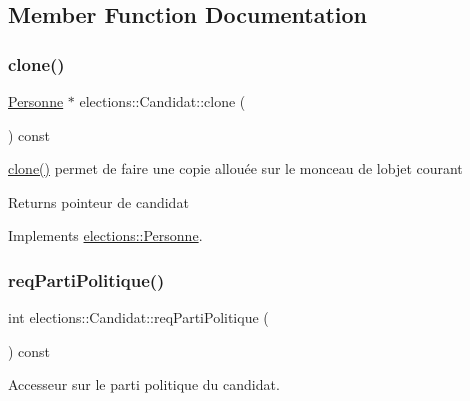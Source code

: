 \subsection{Member Function Documentation}
\mbox{\label{classelections_1_1Candidat_ac93fed3409eb4617620d70a1d031ae89}} 
\subsubsection{\texorpdfstring{clone()}{clone()}}
{\footnotesize\ttfamily \hyperlink{classelections_1_1Personne}{Personne} $\ast$ elections\+::\+Candidat\+::clone (\begin{DoxyParamCaption}{ }\end{DoxyParamCaption}) const\hspace{0.3cm}{\ttfamily [virtual]}}



\hyperlink{classelections_1_1Candidat_ac93fed3409eb4617620d70a1d031ae89}{clone()} permet de faire une copie allouée sur le monceau de l\textquotesingle{}objet courant 

\begin{DoxyReturn}{Returns}
pointeur de candidat 
\end{DoxyReturn}


Implements \hyperlink{classelections_1_1Personne}{elections\+::\+Personne}.

\mbox{\label{classelections_1_1Candidat_a150b2e680fbea708f222e5e8bfd823e4}} 
\subsubsection{\texorpdfstring{req\+Parti\+Politique()}{reqPartiPolitique()}}
{\footnotesize\ttfamily int elections\+::\+Candidat\+::req\+Parti\+Politique (\begin{DoxyParamCaption}{ }\end{DoxyParamCaption}) const}



Accesseur sur le parti politique du candidat. 

